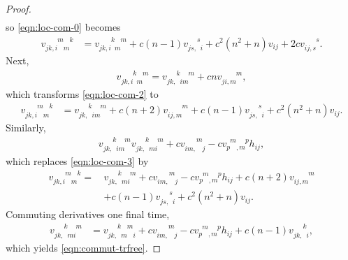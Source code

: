\documentclass[10pt,reqno]{amsart}
\newcommand{\vdddu}[4]{v_{#1 #2, #3}^{\phantom{#1#2,#3} #4}}
\newcommand{\vddud}[4]{v_{#1 #2, \phantom{#3} #4}^{\phantom{#1#2,} #3 \phantom{#4}}}
\newcommand{\vdudu}[4]{v_{#1 \phantom{#2}, #3 \phantom{#4}}^{\phantom{#1} #2 \phantom{, #3} #4}}
\newcommand{\vdddudu}[6]{v_{#1#2,#3\phantom{#4}#5\phantom{#6}}^{\phantom{#1#2,#3}#4\phantom{#5}#6}}
\newcommand{\vdduddu}[6]{v_{#1#2,\phantom{#3}#4#5\phantom{#6}}^{\phantom{#1#2,}#3\phantom{#4#5}#6}}
\newcommand{\vddudud}[6]{v_{#1#2,\phantom{#3}#4\phantom{#5}#6}^{\phantom{#1#2,}#3\phantom{#4}#5}}
\begin{document}
\begin{proof}
\begin{align*}
\end{align*}
so \eqref{eqn:loc-com-0} becomes
\begin{align}\label{eqn:loc-com-2}
\vdddudu{j}{k}{i}{m}{m}{k} &= \vdddudu{j}{k}{i}{k}{m}{m} + c(n-1) \vddud{j}{s}{s}{i}  + c^2 (n^2+n) v_{ij}  +  2 c \vdddu{i}{j}{s}{s}.
\end{align}
Next, 
\begin{align*}
\vdddudu{j}{k}{i}{k}{m}{m} = \vdduddu{j}{k}{k}{i}{m}{m} + c n \vdddu{j}{i}{m}{m},
\end{align*}
which transforms \eqref{eqn:loc-com-2} to 
\begin{align} \label{eqn:loc-com-3}
\vdddudu{j}{k}{i}{m}{m}{k} &=\vdduddu{j}{k}{k}{i}{m}{m} + c (n+2) \vdddu{i}{j}{m}{m} + c(n-1) \vddud{j}{s}{s}{i} + c^2 (n^2+n) v_{ij}.
\end{align}
Similarly, 
\begin{align*}
\vdduddu{j}{k}{k}{i}{m}{m}   \vdduddu{j}{k}{k}{m}{i}{m} + c \vddud{i}{m}{m}{j}  - c \vdudu{p}{m}{m}{p}  h_{ij},   
\end{align*}
which replaces \eqref{eqn:loc-com-3} by 
\begin{align*}
\vdddudu{j}{k}{i}{m}{m}{k} = \, & \vdduddu{j}{k}{k}{m}{i}{m} + c \vddud{i}{m}{m}{j} - c \vdudu{p}{m}{m}{p}  h_{ij} + c (n+2) \vdddu{i}{j}{m}{m}  
\nonumber \\ & + c(n-1) \vddud{j}{s}{s}{i}  + c^2 (n^2+n) v_{ij}.
\end{align*}
Commuting derivatives one final time, 
\begin{align*}
\vdduddu{j}{k}{k}{m}{i}{m} 
 &= \vddudud{j}{k}{k}{m}{m}{i} +  c \vddud{i}{m}{m}{j}  - c \vdudu{p}{m}{m}{p}  h_{ij} + c(n-1) \vddud{j}{k}{k}{i},
\end{align*}
which yields \eqref{eqn:commut-trfree}.
\end{proof}
\end{document}
